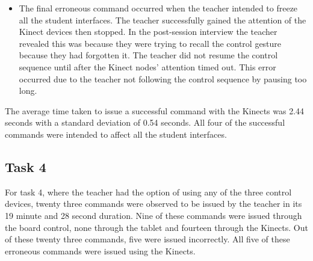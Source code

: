 \documentclass[manuscript, review, screen]{acmart}
\begin{document}
\begin{itemize}
\item The final erroneous command occurred when the teacher intended to freeze all the student interfaces.
The teacher successfully gained the attention of the Kinect devices then stopped.
In the post-session interview the teacher revealed this was because they were trying to recall the control gesture because they had forgotten it.
The teacher did not resume the control sequence until after the Kinect nodes' attention timed out.
This error occurred due to the teacher not following the control sequence by pausing too long.
\end{itemize}


The average time taken to issue a successful command with the Kinects was 2.44 seconds with a standard deviation of 0.54 seconds.
All four of the successful commands were intended to affect all the student interfaces.

\subsection{Task 4}
\label{sec:results:task4}  

For task 4, where the teacher had the option of using any of the three control devices, twenty three commands were observed to be issued by the teacher in its 19 minute and 28 second duration.
Nine of these commands were issued through the board control, none through the tablet and fourteen through the Kinects.
Out of these twenty three commands, five were issued incorrectly.
All five of these erroneous commands were issued using the Kinects.
\end{document}
